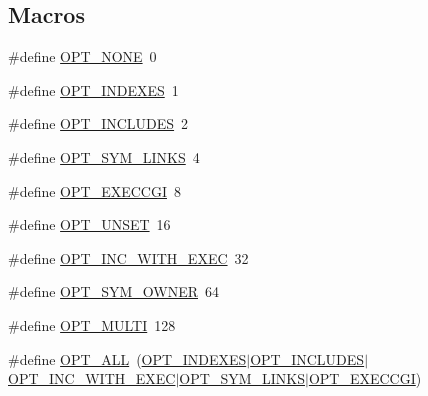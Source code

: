 \subsection*{Macros}
\begin{DoxyCompactItemize}
\item 
\#define \hyperlink{group__APACHE__CORE__HTTPD__ACESSORS_ga05e4e8cdcd42d55b8d22289188be3fbf}{O\+P\+T\+\_\+\+N\+O\+NE}~0
\item 
\#define \hyperlink{group__APACHE__CORE__HTTPD__ACESSORS_ga9fbd98a1c54054a92f0a3fd0f62f763f}{O\+P\+T\+\_\+\+I\+N\+D\+E\+X\+ES}~1
\item 
\#define \hyperlink{group__APACHE__CORE__HTTPD__ACESSORS_gae04fc53d8610e7da61c11a1f88eef343}{O\+P\+T\+\_\+\+I\+N\+C\+L\+U\+D\+ES}~2
\item 
\#define \hyperlink{group__APACHE__CORE__HTTPD__ACESSORS_ga33b66321dd597ece719badc8bb7b6035}{O\+P\+T\+\_\+\+S\+Y\+M\+\_\+\+L\+I\+N\+KS}~4
\item 
\#define \hyperlink{group__APACHE__CORE__HTTPD__ACESSORS_ga35d0bf27679f60f9045864007b03881b}{O\+P\+T\+\_\+\+E\+X\+E\+C\+C\+GI}~8
\item 
\#define \hyperlink{group__APACHE__CORE__HTTPD__ACESSORS_ga5c62c4311a0c60c9fa36d109f4bf9004}{O\+P\+T\+\_\+\+U\+N\+S\+ET}~16
\item 
\#define \hyperlink{group__APACHE__CORE__HTTPD__ACESSORS_ga3bcbdb3da98d1e1319442a3bc5a036f2}{O\+P\+T\+\_\+\+I\+N\+C\+\_\+\+W\+I\+T\+H\+\_\+\+E\+X\+EC}~32
\item 
\#define \hyperlink{group__APACHE__CORE__HTTPD__ACESSORS_ga168575af5f7cf32e2d69a9d51701adff}{O\+P\+T\+\_\+\+S\+Y\+M\+\_\+\+O\+W\+N\+ER}~64
\item 
\#define \hyperlink{group__APACHE__CORE__HTTPD__ACESSORS_gadf94c74beaf0faad5783cacc773375f4}{O\+P\+T\+\_\+\+M\+U\+L\+TI}~128
\item 
\#define \hyperlink{group__APACHE__CORE__HTTPD__ACESSORS_ga2981c5f50d55930a31b22cc2d44a7989}{O\+P\+T\+\_\+\+A\+LL}~(\hyperlink{group__APACHE__CORE__HTTPD__ACESSORS_ga9fbd98a1c54054a92f0a3fd0f62f763f}{O\+P\+T\+\_\+\+I\+N\+D\+E\+X\+ES}$\vert$\hyperlink{group__APACHE__CORE__HTTPD__ACESSORS_gae04fc53d8610e7da61c11a1f88eef343}{O\+P\+T\+\_\+\+I\+N\+C\+L\+U\+D\+ES}$\vert$\hyperlink{group__APACHE__CORE__HTTPD__ACESSORS_ga3bcbdb3da98d1e1319442a3bc5a036f2}{O\+P\+T\+\_\+\+I\+N\+C\+\_\+\+W\+I\+T\+H\+\_\+\+E\+X\+EC}$\vert$\hyperlink{group__APACHE__CORE__HTTPD__ACESSORS_ga33b66321dd597ece719badc8bb7b6035}{O\+P\+T\+\_\+\+S\+Y\+M\+\_\+\+L\+I\+N\+KS}$\vert$\hyperlink{group__APACHE__CORE__HTTPD__ACESSORS_ga35d0bf27679f60f9045864007b03881b}{O\+P\+T\+\_\+\+E\+X\+E\+C\+C\+GI})
\end{DoxyCompactItemize}


